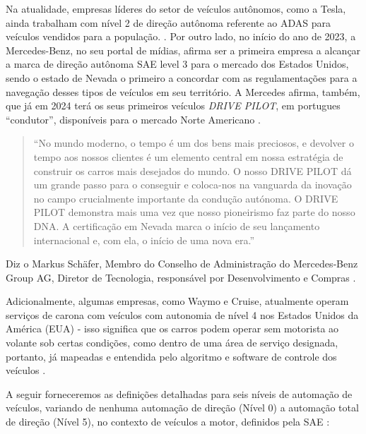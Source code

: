 Na atualidade, empresas líderes do setor de veículos autônomos, como a Tesla, ainda trabalham com nível 2 de direção autônoma referente ao ADAS para veículos vendidos para a população. \cite{4cenarios_ocidental}.
Por outro lado, no início do ano de 2023, a Mercedes-Benz, no seu portal de mídias, afirma ser a primeira empresa a alcançar a marca de direção autônoma SAE level 3 para o mercado dos Estados Unidos, sendo o estado de Nevada o primeiro a concordar com as regulamentações para a navegação desses tipos de veículos em seu território. A Mercedes afirma, também, que já em 2024 terá os seus primeiros veículos \textit{DRIVE PILOT}, em portugues “condutor”, disponíveis para o mercado Norte Americano \cite{mercedes3}.

\begin{quote}
“No mundo moderno, o tempo é um dos bens mais preciosos, e devolver o tempo aos nossos clientes é um elemento central em nossa estratégia de construir os carros mais desejados do mundo. O nosso DRIVE PILOT dá um grande passo para o conseguir e coloca-nos na vanguarda da inovação no campo crucialmente importante da condução autónoma. O DRIVE PILOT demonstra mais uma vez que nosso pioneirismo faz parte do nosso DNA. A certificação em Nevada marca o início de seu lançamento internacional e, com ela, o início de uma nova era.”

\end{quote}
Diz o Markus Schäfer, Membro do Conselho de Administração do Mercedes‑Benz Group AG, Diretor de Tecnologia, responsável por Desenvolvimento e Compras \cite{mercedes3}.

Adicionalmente, algumas empresas, como Waymo e Cruise, atualmente operam serviços de carona com veículos com autonomia de nível 4 nos Estados Unidos da América (EUA) - isso significa que os carros podem operar sem motorista ao volante sob certas condições, como dentro de uma área de serviço designada, portanto, já mapeadas e entendida pelo algoritmo e software de controle dos veículos \cite{Houser2023-dn}.



A seguir forneceremos as definições detalhadas para seis níveis de automação de veículos, variando de nenhuma automação de direção (Nível 0) a automação total de direção (Nível 5), no contexto de veículos a motor, definidos pela SAE \cite{SAE}:

